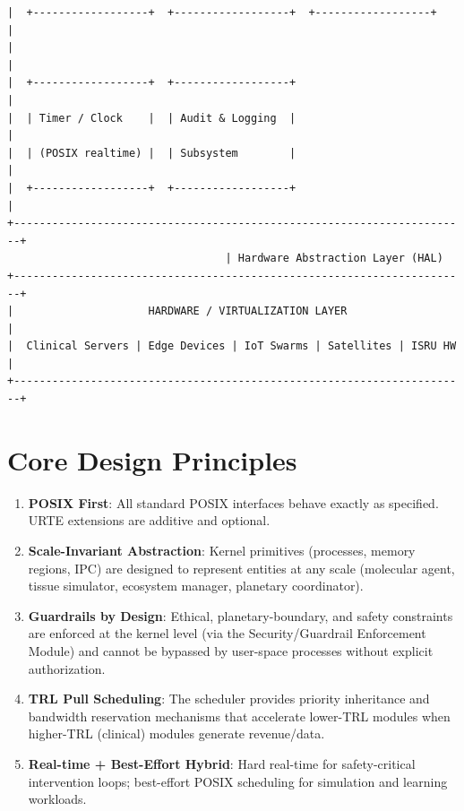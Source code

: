 \documentclass[11pt,a4paper]{report}
\begin{document}
\begin{lstlisting}[style=kernelschema, caption={URTE Kernel High-Level Architecture}]
|  +------------------+  +------------------+  +------------------+     |
|                                                                       |
|  +------------------+  +------------------+                           |
|  | Timer / Clock    |  | Audit & Logging  |                           |
|  | (POSIX realtime) |  | Subsystem        |                           |
|  +------------------+  +------------------+                           |
+-----------------------------------------------------------------------+
                                  | Hardware Abstraction Layer (HAL)
+-----------------------------------------------------------------------+
|                     HARDWARE / VIRTUALIZATION LAYER                   |
|  Clinical Servers | Edge Devices | IoT Swarms | Satellites | ISRU HW   |
+-----------------------------------------------------------------------+
\end{lstlisting}

\section{Core Design Principles}

\begin{enumerate}
    \item \textbf{POSIX First}: All standard POSIX interfaces behave exactly as specified. URTE extensions are additive and optional.
    \item \textbf{Scale-Invariant Abstraction}: Kernel primitives (processes, memory regions, IPC) are designed to represent entities at any scale (molecular agent, tissue simulator, ecosystem manager, planetary coordinator).
    \item \textbf{Guardrails by Design}: Ethical, planetary-boundary, and safety constraints are enforced at the kernel level (via the Security/Guardrail Enforcement Module) and cannot be bypassed by user-space processes without explicit authorization.
    \item \textbf{TRL Pull Scheduling}: The scheduler provides priority inheritance and bandwidth reservation mechanisms that accelerate lower-TRL modules when higher-TRL (clinical) modules generate revenue/data.
    \item \textbf{Real-time + Best-Effort Hybrid}: Hard real-time for safety-critical intervention loops; best-effort POSIX scheduling for simulation and learning workloads.
\end{enumerate}

\end{document}
